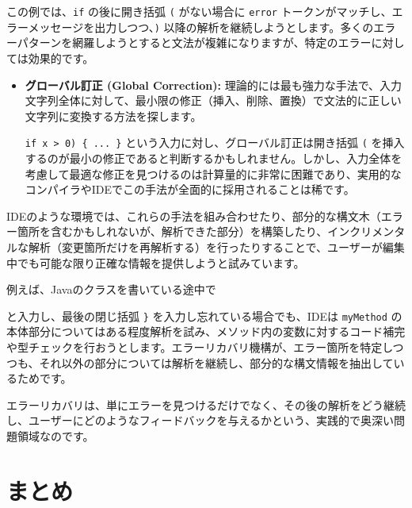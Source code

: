 この例では、\texttt{if} の後に開き括弧 \texttt{(} がない場合に
\texttt{error}
トークンがマッチし、エラーメッセージを出力しつつ、\texttt{)}
以降の解析を継続しようとします。多くのエラーパターンを網羅しようとすると文法が複雑になりますが、特定のエラーに対しては効果的です。

\begin{itemize}
\item
  \textbf{グローバル訂正 (Global Correction):}
  理論的には最も強力な手法で、入力文字列全体に対して、最小限の修正（挿入、削除、置換）で文法的に正しい文字列に変換する方法を探します。

  \texttt{if\ x\ \textgreater{}\ 0)\ \{\ ...\ \}}
  という入力に対し、グローバル訂正は開き括弧 \texttt{(}
  を挿入するのが最小の修正であると判断するかもしれません。しかし、入力全体を考慮して最適な修正を見つけるのは計算量的に非常に困難であり、実用的なコンパイラやIDEでこの手法が全面的に採用されることは稀です。
\end{itemize}

IDEのような環境では、これらの手法を組み合わせたり、部分的な構文木（エラー箇所を含むかもしれないが、解析できた部分）を構築したり、インクリメンタルな解析（変更箇所だけを再解析する）を行ったりすることで、ユーザーが編集中でも可能な限り正確な情報を提供しようと試みています。

例えば、Javaのクラスを書いている途中で

\begin{Shaded}
\begin{Highlighting}[]
    \NormalTok{() \{ }
\NormalTok{  \}}
\end{Highlighting}
\end{Shaded}

と入力し、最後の閉じ括弧 \texttt{\}} を入力し忘れている場合でも、IDEは
\texttt{myMethod}
の本体部分についてはある程度解析を試み、メソッド内の変数に対するコード補完や型チェックを行おうとします。エラーリカバリ機構が、エラー箇所を特定しつつも、それ以外の部分については解析を継続し、部分的な構文情報を抽出しているためです。

エラーリカバリは、単にエラーを見つけるだけでなく、その後の解析をどう継続し、ユーザーにどのようなフィードバックを与えるかという、実践的で奥深い問題領域なのです。

\hypertarget{chapter7-ux307eux3068ux3081}{%
\section{まとめ}\label{chapter7-ux307eux3068ux3081}}

